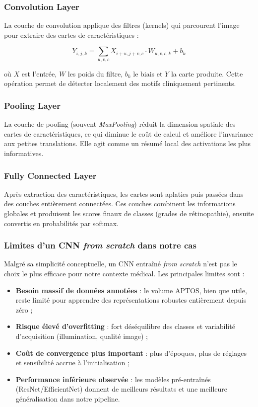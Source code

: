 \documentclass[12pt,a4paper,oneside]{report}
\begin{document}
\subsubsection{Convolution Layer}

La couche de convolution applique des filtres (kernels) qui parcourent
l'image pour extraire des cartes de caractéristiques :

\begin{equation}
Y_{i,j,k} = \sum_{u,v,c} X_{i+u, j+v, c} \cdot W_{u,v,c,k} + b_k
\end{equation}

où $X$ est l'entrée, $W$ les poids du filtre, $b_k$ le biais et $Y$
la carte produite. Cette opération permet de détecter localement des
motifs cliniquement pertinents.

\subsubsection{Pooling Layer}

La couche de pooling (souvent \textit{MaxPooling}) réduit la dimension
spatiale des cartes de caractéristiques, ce qui diminue le coût de calcul
et améliore l'invariance aux petites translations. Elle agit comme un
résumé local des activations les plus informatives.

\subsubsection{Fully Connected Layer}

Après extraction des caractéristiques, les cartes sont aplaties puis
passées dans des couches entièrement connectées. Ces couches combinent
les informations globales et produisent les scores finaux de classes
(grades de rétinopathie), ensuite convertis en probabilités par softmax.

\subsubsection{Limites d'un CNN \textit{from scratch} dans notre cas}

Malgré sa simplicité conceptuelle, un CNN entraîné \textit{from scratch}
n'est pas le choix le plus efficace pour notre contexte médical. Les
principales limites sont :

\begin{itemize}
    \item \textbf{Besoin massif de données annotées} : le volume APTOS,
        bien que utile, reste limité pour apprendre des représentations
        robustes entièrement depuis zéro ;
    \item \textbf{Risque élevé d'overfitting} : fort déséquilibre des classes
        et variabilité d'acquisition (illumination, qualité image) ;
    \item \textbf{Coût de convergence plus important} : plus d'époques,
        plus de réglages et sensibilité accrue à l'initialisation ;
    \item \textbf{Performance inférieure observée} : les modèles pré-entraînés
        (ResNet/EfficientNet) donnent de meilleurs résultats et une
        meilleure généralisation dans notre pipeline.
\end{itemize}
\end{document}
